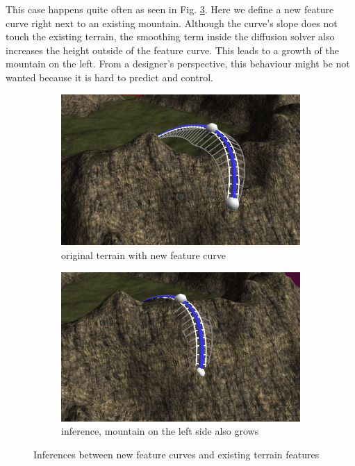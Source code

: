 \documentclass[journal, letterpaper]{IEEEtran}
\begin{document}
This case happens quite often as seen in Fig. \ref{fig:diffusion3}. Here we define a new feature curve right next to an existing mountain. Although the curve's slope does not touch the existing terrain, the smoothing term inside the diffusion solver also increases the height outside of the feature curve. This leads to a growth of the mountain on the left.
From a designer's perspective, this behaviour might be not wanted because it is hard to predict and control.

\begin{figure}
	\centering
	\begin{subfigure}[b]{0.45\textwidth}
		\includegraphics[width=\textwidth]{images/diffusionError1}
		\caption{original terrain with new feature curve}
		\label{fig:diffusionError1}
	\end{subfigure}
	\begin{subfigure}[b]{0.45\textwidth}
		\includegraphics[width=\textwidth]{images/diffusionError2}
		\caption{inference, mountain on the left side also grows}
		\label{fig:diffusionError2}
	\end{subfigure}
	\caption{Inferences between new feature curves and existing terrain features}\label{fig:diffusion3}
\end{figure}
\end{document}
